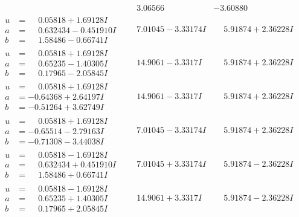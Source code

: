 \documentclass[1p]{elsarticle_modified}
\theoremstyle{definition}
\begin{document}
$$\begin{array}{c|c|c}
 & \phantom{-}3.06566\phantom{ +0.000000I} & -3.60880\phantom{ +0.000000I} \\ \hline\begin{aligned}
u &= \phantom{-}0.05818 + 1.69128 I \\
a &= \phantom{-}0.632434 - 0.451910 I \\
b &= \phantom{-}1.58486 - 0.66741 I\end{aligned}
 & \phantom{-}7.01045 - 3.33174 I & \phantom{-}5.91874 + 2.36228 I \\ \hline\begin{aligned}
u &= \phantom{-}0.05818 + 1.69128 I \\
a &= \phantom{-}0.65235 - 1.40305 I \\
b &= \phantom{-}0.17965 - 2.05845 I\end{aligned}
 & \phantom{-}14.9061 - 3.3317 I & \phantom{-}5.91874 + 2.36228 I \\ \hline\begin{aligned}
u &= \phantom{-}0.05818 + 1.69128 I \\
a &= -0.64368 + 2.64197 I \\
b &= -0.51264 + 3.62749 I\end{aligned}
 & \phantom{-}14.9061 - 3.3317 I & \phantom{-}5.91874 + 2.36228 I \\ \hline\begin{aligned}
u &= \phantom{-}0.05818 + 1.69128 I \\
a &= -0.65514 - 2.79163 I \\
b &= -0.71308 - 3.44038 I\end{aligned}
 & \phantom{-}7.01045 - 3.33174 I & \phantom{-}5.91874 + 2.36228 I \\ \hline\begin{aligned}
u &= \phantom{-}0.05818 - 1.69128 I \\
a &= \phantom{-}0.632434 + 0.451910 I \\
b &= \phantom{-}1.58486 + 0.66741 I\end{aligned}
 & \phantom{-}7.01045 + 3.33174 I & \phantom{-}5.91874 - 2.36228 I \\ \hline\begin{aligned}
u &= \phantom{-}0.05818 - 1.69128 I \\
a &= \phantom{-}0.65235 + 1.40305 I \\
b &= \phantom{-}0.17965 + 2.05845 I\end{aligned}
 & \phantom{-}14.9061 + 3.3317 I & \phantom{-}5.91874 - 2.36228 I \\ \hline\begin{aligned}

\end{aligned}
\end{array}$$
\end{document}
